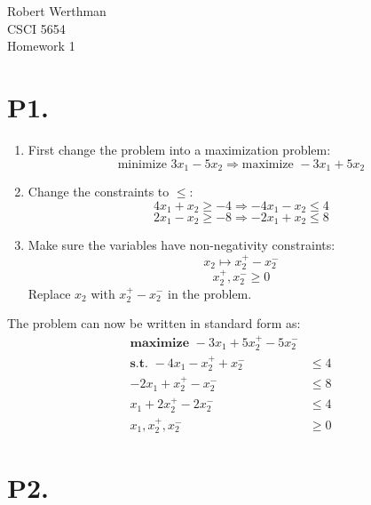 \documentclass[12pt]{article}
\begin{document}
\noindent
Robert Werthman\\
CSCI 5654\\
Homework 1\\

\section*{P1.}
\begin{enumerate}
  \item First change the problem into a maximization problem:
        $$
          \text{minimize } 3x_{1} - 5x_{2} \Rightarrow 
          \text{maximize } -3x_{1} + 5x_{2}
        $$
  \item Change the constraints to $\leq$:
        $$4x_{1} + x_{2} \geq -4 \Rightarrow -4x_{1} - x_{2} \leq 4$$
        $$2x_{1} - x_{2} \geq -8 \Rightarrow -2x_{1} + x_{2} \leq 8$$
  \item Make sure the variables have non-negativity constraints:
        $$x_{2} \mapsto x^{+}_{2} - x^{-}_{2}$$
        $$x^{+}_{2}, x^{-}_{2} \geq 0$$
        Replace $x_{2}$ with $x^{+}_{2} - x^{-}_{2}$ in the problem.
\end{enumerate}
The problem can now be written in standard form as:
\begin{align*}
  \textbf{maximize } -3x_{1} + 5x^{+}_{2} - 5x^{-}_{2} &\\
  \textbf{s.t. }     -4x_{1} - x^{+}_{2} + x^{-}_{2} &\leq 4\\
                     -2x_{1} + x^{+}_{2} - x^{-}_{2} &\leq 8\\
                     x_{1} + 2x^{+}_{2} - 2x^{-}_{2} &\leq 4\\
                     x_{1}, x^{+}_{2}, x^{-}_{2} &\geq 0
\end{align*}
\newpage

\section*{P2.}
\end{document}
